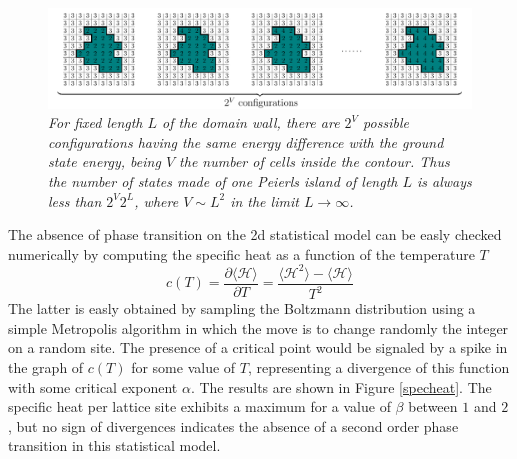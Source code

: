\documentclass[aps,pra,superscriptaddress]{revtex4}
\newcommand\be            {\begin{equation}}
\newcommand\ee            {\end{equation}}
\renewcommand{\(}{\left(}
\renewcommand{\)}{\right)}
\renewcommand{\[}{\left[}
\renewcommand{\]}{\right]}
\newcommand\med[1]{\langle #1 \rangle }
\begin{document}
\begin{figure}[H]
\hspace{-0.7cm}
\includegraphics[scale=0.95]{Figures/peierls.pdf}
\caption{{\em For fixed length $L$ of the domain wall, there are $2^V$ possible configurations having the same energy difference with the ground state energy, being $V$ the number of cells inside the contour. Thus the number of states made of one Peierls island of length $L$ is always less than $2^V 2^L$, where $V \sim L^2$ in the limit $L \to \infty$. }}
\label{peierls}
\end{figure}

\noindent
The absence of phase transition on the 2d statistical model can be easly checked numerically by computing the specific heat as a function of the temperature $T$ 
\be 
c(T) = \frac{\partial \med{ \mathcal{H} } }{ \partial T } = \frac{ \med{ \mathcal{H}^2 } - \med{ \mathcal{H} } }{ T^2 }
\ee
The latter is easly obtained by sampling the Boltzmann distribution using a simple Metropolis algorithm \cite{metro} in which the move is to change randomly the integer on a random site. The presence of a critical point would be signaled by a spike in the graph of $c(T)$ for some value of $T$, representing a divergence of this function with some critical exponent $\alpha$. The results are shown in Figure \ref{specheat}. The specific heat per lattice site exhibits a maximum for a value of $\beta$ between $1$ and $2$, but no sign of divergences indicates the absence of a second order phase transition in this statistical model.
\end{document}
